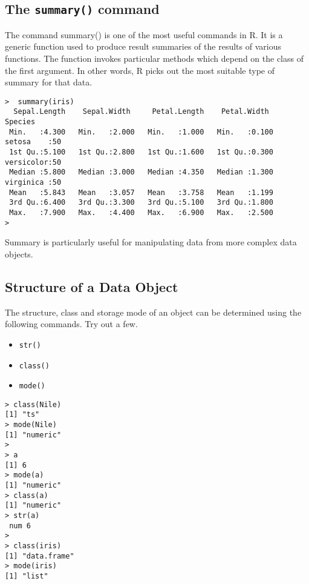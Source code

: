 \documentclass[a4paper,12pt]{article}
\begin{document}
\subsection{The \texttt{summary()} command}
The command summary() is one of the most useful commands in R. It is a generic function used to produce result summaries of the results of various functions. The function invokes particular methods which depend on the class of the first argument.
In other words,  R picks out the most suitable type of summary for that data.
\begin{verbatim}
>  summary(iris)
  Sepal.Length    Sepal.Width     Petal.Length    Petal.Width          Species  
 Min.   :4.300   Min.   :2.000   Min.   :1.000   Min.   :0.100   setosa    :50  
 1st Qu.:5.100   1st Qu.:2.800   1st Qu.:1.600   1st Qu.:0.300   versicolor:50  
 Median :5.800   Median :3.000   Median :4.350   Median :1.300   virginica :50  
 Mean   :5.843   Mean   :3.057   Mean   :3.758   Mean   :1.199                  
 3rd Qu.:6.400   3rd Qu.:3.300   3rd Qu.:5.100   3rd Qu.:1.800                  
 Max.   :7.900   Max.   :4.400   Max.   :6.900   Max.   :2.500                  
> 
\end{verbatim}
Summary is particularly useful for manipulating data from more complex data objects.
\subsection{Structure of a Data Object}
The structure, class and storage mode of an object can be determined using the following commands.  Try out a few.
\begin{itemize}
\item \texttt{str()}
\item \texttt{class()}
\item \texttt{mode()}
\end{itemize}

\begin{framed}
\begin{verbatim}
> class(Nile)
[1] "ts"
> mode(Nile)
[1] "numeric"
>
> a
[1] 6
> mode(a)
[1] "numeric"
> class(a)
[1] "numeric"
> str(a)
 num 6
>
> class(iris)
[1] "data.frame"
> mode(iris)
[1] "list"
\end{verbatim}
\end{framed}







\end{document}
